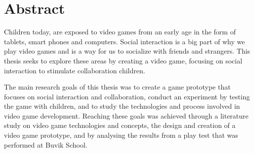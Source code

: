\chapter*{Abstract}

Children today, are exposed to video games from an early age in the form of tablets, smart phones and computers. Social interaction is a big part of why we play video games and is a way for us to socialize with friends and strangers. This thesis seeks to explore these areas by creating a video game, focusing on social interaction to stimulate collaboration  children.



The main research goals of this thesis was to create a game prototype that focuses on social interaction and collaboration, conduct an experiment by testing the game with children, and to study the technologies and process involved in video game development. Reaching these goals was achieved through a literature study on video game technologies and concepts, the design and creation of a video game prototype, and by analysing the results from a play test that was performed at Buvik School.


